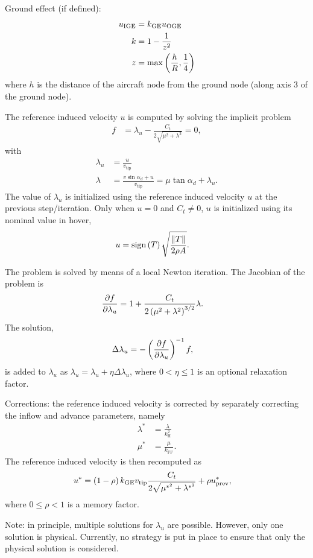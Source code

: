 Ground effect (if defined):
\begin{subequations}
\begin{align}
	u_\text{IGE}
	&=
	k_\text{GE} u_\text{OGE}
	\\
	k
	&=
	1 - \frac{1}{z^2}
	\\
	z
	&= \max\left( \frac{h}{R}, \frac{1}{4} \right)
\end{align}
\end{subequations}
where $h$ is the distance of the aircraft node from the ground node
(along axis 3 of the ground node).

The reference induced velocity $u$ is computed by solving the implicit problem
\begin{align}
	f
	&=
	\lambda_u
	- \frac{C_t}{2\sqrt{\mu^2 + \lambda^2}}
	=
	0
	,
\end{align}
with
\begin{subequations}
\begin{align}
	\lambda_u
	&=
	\frac{u}{v_\text{tip}}
	\\
	\lambda
	&=
	\frac{v \sin\alpha_d + u}{v_\text{tip}}
	=
	\mu \tan\alpha_d
	+ \lambda_u
	.
\end{align}
\end{subequations}
The value of $\lambda_u$ is initialized using the reference induced velocity
$u$ at the previous step/iteration.
Only when $u=0$ and $C_t\neq 0$, $u$ is initialized using its nominal value
in hover,
\begin{align}
	u
	&=
	\text{sign}\left( T \right) \sqrt{\frac{\left\| T \right\|}{2 \rho A}}
	.
\end{align}

The problem is solved by means of a local Newton iteration.
The Jacobian of the problem is
\begin{align}
	\frac{\partial f}{\partial \lambda_u}
	&=
	1 + \frac{C_t}{2 \left( \mu^2 + \lambda^2 \right)^{3/2}} \lambda
	.
\end{align}
The solution,
\begin{align}
	\Delta\lambda_u
	&=
	- \left( \frac{\partial f}{\partial \lambda_u} \right)^{-1} f
	,
\end{align}
is added to $\lambda_u$ as
$\lambda_u = \lambda_u + \eta \Delta\lambda_u$,
where $0 < \eta \le 1$ is an optional relaxation factor.

Corrections:
the reference induced velocity is corrected by separately correcting
the inflow and advance parameters, namely
\begin{subequations}
\begin{align}
	\lambda^*
	&=
	\frac{\lambda}{k_\text{H}^2}
	\\
	\mu^*
	&=
	\frac{\mu}{k_\text{FF}}
	.
\end{align}
\end{subequations}
The reference induced velocity is then recomputed as
\begin{align}
	u^*
	&=
	\left( 1 - \rho \right) k_\text{GE} v_\text{tip}
		\frac{C_t}{2 \sqrt{\mu^{*^2} + \lambda^{*^2}}}
	+ \rho u^*_\text{prev}
	,
\end{align}
where $0 \le \rho < 1$ is a memory factor.

Note: in principle, multiple solutions for $\lambda_u$ are possible.
However, only one solution is physical.
Currently, no strategy is put in place to ensure that only the physical
solution is considered.


